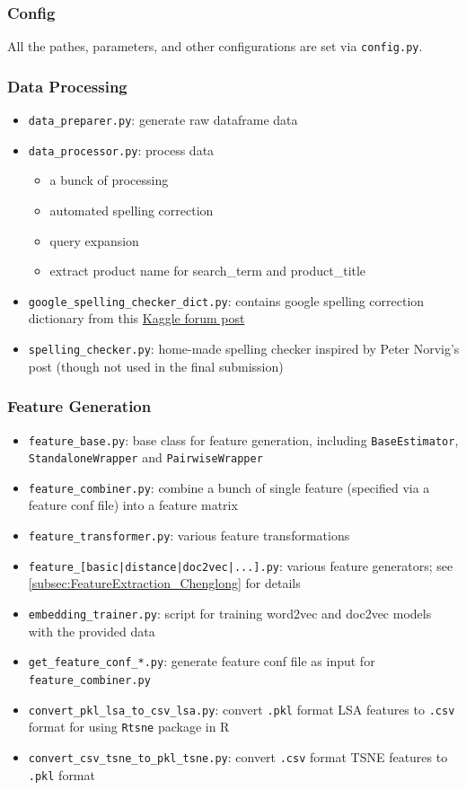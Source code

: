 \documentclass[12pt]{article}
\begin{document}
{{\subsubsection{Config}
All the pathes, parameters, and other configurations are set via \texttt{config.py}.
\subsubsection{Data Processing}
\begin{itemize}
\item \texttt{data\_preparer.py}: generate raw dataframe data
\item \texttt{data\_processor.py}: process data
\begin{itemize}
\item a bunck of processing
\item automated spelling correction
\item query expansion
\item extract product name for search\_term and product\_title
\end{itemize}
\item \texttt{google\_spelling\_checker\_dict.py}: contains google spelling correction dictionary from this \href{https://www.kaggle.com/steubk/home-depot-product-search-relevance/fixing-typos}{Kaggle forum post}
\item \texttt{spelling\_checker.py}: home-made spelling checker inspired by Peter Norvig's post\cite{PeterNorvig} (though not used in the final submission)
\end{itemize}
\subsubsection{Feature Generation}
\begin{itemize}
\item \texttt{feature\_base.py}: base class for feature generation, including \texttt{BaseEstimator}, \texttt{StandaloneWrapper} and \texttt{PairwiseWrapper}
\item \texttt{feature\_combiner.py}: combine a bunch of single feature (specified via a feature conf file) into a feature matrix
\item \texttt{feature\_transformer.py}: various feature transformations
\item \texttt{feature\_[basic|distance|doc2vec|...].py}: various feature generators; see \ref{subsec:FeatureExtraction_Chenglong} for details
\item \texttt{embedding\_trainer.py}: script for training word2vec and doc2vec models with the provided data
\item \texttt{get\_feature\_conf\_*.py}: generate feature conf file as input for \texttt{feature\_combiner.py}
\item \texttt{convert\_pkl\_lsa\_to\_csv\_lsa.py}: convert \texttt{.pkl} format LSA features to \texttt{.csv} format for using \texttt{Rtsne} package in R
\item \texttt{convert\_csv\_tsne\_to\_pkl\_tsne.py}: convert \texttt{.csv} format TSNE features to \texttt{.pkl} format
\end{itemize}
}}
\end{document}
